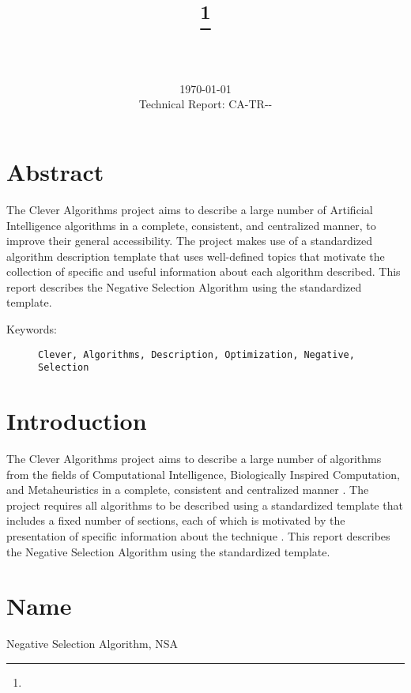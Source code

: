 \documentclass[a4paper, 11pt]{article}
\title{{\myreporttitle}\footnote{\myreportlicense}}
\author{\myreportauthor\\{\myreportemail}\\\small\myreportproject}
\date{\today\\{\small{Technical Report: CA-TR-{\myreportdate}-\myreportversion}}}
\begin{document}
\maketitle

\section*{Abstract} 
The Clever Algorithms project aims to describe a large number of Artificial Intelligence algorithms in a complete, consistent, and centralized manner, to improve their general accessibility. 
The project makes use of a standardized algorithm description template that uses well-defined topics that motivate the collection of specific and useful information about each algorithm described.
This report describes the Negative Selection Algorithm using the standardized template.

\begin{description}
	\item[Keywords:] {\small\texttt{Clever, Algorithms, Description, Optimization, Negative, Selection}}
\end{description} 

\section{Introduction} 
\label{sec:intro}
The Clever Algorithms project aims to describe a large number of algorithms from the fields of Computational Intelligence, Biologically Inspired Computation, and Metaheuristics in a complete, consistent and centralized manner \cite{Brownlee2010}.
The project requires all algorithms to be described using a standardized template that includes a fixed number of sections, each of which is motivated by the presentation of specific information about the technique \cite{Brownlee2010a}.
This report describes the Negative Selection Algorithm using the standardized template.

\section{Name} 
\label{sec:name}
Negative Selection Algorithm, NSA
\end{document}
